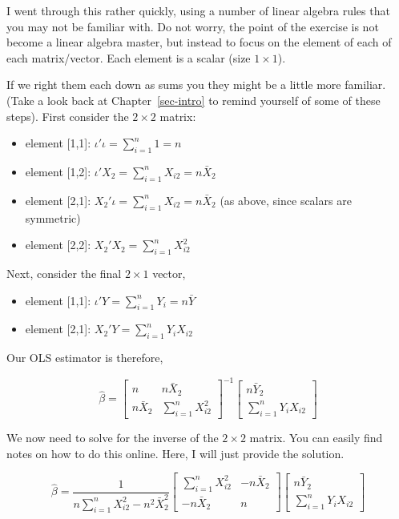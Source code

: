 \documentclass[
  letterpaper,
  DIV=11,
  numbers=noendperiod]{scrreprt}
\begin{document}
I went through this rather quickly, using a number of linear algebra
rules that you may not be familiar with. Do not worry, the point of the
exercise is not become a linear algebra master, but instead to focus on
the element of each of each matrix/vector. Each element is a scalar
(size \(1\times 1\)).

If we right them each down as sums you they might be a little more
familiar. (Take a look back at Chapter~\ref{sec-intro} to remind
yourself of some of these steps). First consider the \(2\times 2\)
matrix:

\begin{itemize}
\item
  element {[}1,1{]}: \(\iota'\iota = \sum_{i=1}^n 1 = n\)
\item
  element {[}1,2{]}: \(\iota'X_2 = \sum_{i=1}^nX_{i2} = n\bar{X}_2\)
\item
  element {[}2,1{]}: \(X_2'\iota = \sum_{i=1}^nX_{i2} = n\bar{X}_2\) (as
  above, since scalars are symmetric)
\item
  element {[}2,2{]}: \(X_2'X_2=\sum_{i=1}^nX_{i2}^2\)
\end{itemize}

Next, consider the final \(2\times 1\) vector,

\begin{itemize}
\item
  element {[}1,1{]}: \(\iota'Y = \sum_{i=1}^n Y_i = n\bar{Y}\)
\item
  element {[}2,1{]}: \(X_2'Y = \sum_{i=1}^nY_iX_{i2}\)
\end{itemize}

Our OLS estimator is therefore,

\[
\hat{\beta} = \begin{bmatrix} n & n\bar{X}_2 \\ n\bar{X}_2 & \sum_{i=1}^nX_{i2}^2 \end{bmatrix}^{-1}\begin{bmatrix}n\bar{Y}_2  \\ \sum_{i=1}^nY_iX_{i2} \end{bmatrix}
\]

We now need to solve for the inverse of the \(2\times 2\) matrix. You
can easily find notes on how to do this online. Here, I will just
provide the solution.

\[
\hat{\beta} = \frac{1}{n\sum_{i=1}^nX_{i2}^2-n^2\bar{X}_2^2}\begin{bmatrix} \sum_{i=1}^nX_{i2}^2 & -n\bar{X}_2 \\ -n\bar{X}_2 &  n\end{bmatrix}\begin{bmatrix}n\bar{Y}_2  \\ \sum_{i=1}^nY_iX_{i2} \end{bmatrix}
\]
\end{document}
